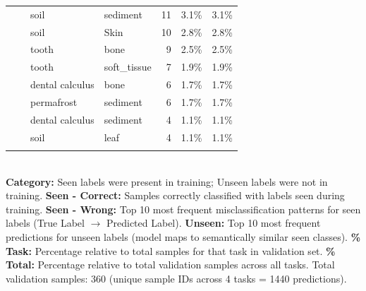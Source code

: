 \begin{longtable}{@{}llp{2.8cm}p{2.8cm}rrr@{}}
  &  & soil & sediment & 11 & 3.1\% & 3.1\% \\
  &  & soil & Skin & 10 & 2.8\% & 2.8\% \\
  &  & tooth & bone & 9 & 2.5\% & 2.5\% \\
  &  & tooth & soft\_tissue & 7 & 1.9\% & 1.9\% \\
  &  & dental calculus & bone & 6 & 1.7\% & 1.7\% \\
  &  & permafrost & sediment & 6 & 1.7\% & 1.7\% \\
  &  & dental calculus & sediment & 4 & 1.1\% & 1.1\% \\
  &  & soil & leaf & 4 & 1.1\% & 1.1\% \\
\addlinespace
\end{longtable}
\endgroup
{}
\\[2mm]
{\footnotesize
\textbf{Category:} Seen labels were present in training; Unseen labels were not in training. 
\textbf{Seen - Correct:} Samples correctly classified with labels seen during training. 
\textbf{Seen - Wrong:} Top 10 most frequent misclassification patterns for seen labels (True Label $\to$ Predicted Label).
\textbf{Unseen:} Top 10 most frequent predictions for unseen labels (model maps to semantically similar seen classes).
\textbf{\% Task:} Percentage relative to total samples for that task in validation set. 
\textbf{\% Total:} Percentage relative to total validation samples across all tasks. 
Total validation samples: 360 (unique sample IDs across 4 tasks = 1440 predictions).
}
